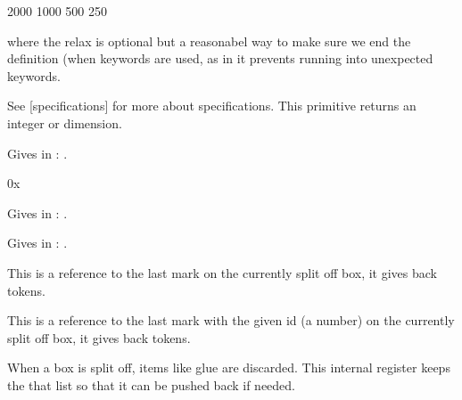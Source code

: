 \starttyping
\specificationdef\MyWidowPenalties
     2000 1000 500 250
\relax
\stoptyping

where the relax is optional but a reasonabel way to make sure we end the
definition (when keywords are used, as in  it prevents running
into unexpected keywords.

\stopnewprimitive

\startnewprimitive[title={\prm {specificationfirst}}]

See  [specifications] for more about specifications. This primitive returns
an integer or dimension.

\startbuffer
\the\specificationfirst{}
\stopbuffer

\typebuffer

Gives in \CONTEXT: \inlinebuffer.

\stopnewprimitive

\startnewprimitive[title={\prm {specificationoptions}}]

\startbuffer
0x\tohexadecimal\specificationoptions\widowpenalties
\stopbuffer

\typebuffer

Gives in \CONTEXT: \inlinebuffer.

\stopnewprimitive

\startnewprimitive[title={\prm {specificationsecond}}]

\startbuffer
\the\specificationsecond{}
\stopbuffer

\typebuffer

Gives in \CONTEXT: \inlinebuffer.

\stopnewprimitive

\startoldprimitive[title={\prm {splitbotmark}}][obsolete=yes]

This is a reference to the last mark on the currently split off box, it gives
back tokens.

\stopoldprimitive

\startoldprimitive[title={\prm {splitbotmarks}}]

This is a reference to the last mark with the given id (a number) on the
currently split off box, it gives back tokens.

\stopoldprimitive

\startoldprimitive[title={\prm {splitdiscards}}]

When a box is split off, items like glue are discarded. This internal register
keeps the that list so that it can be pushed back if needed.

